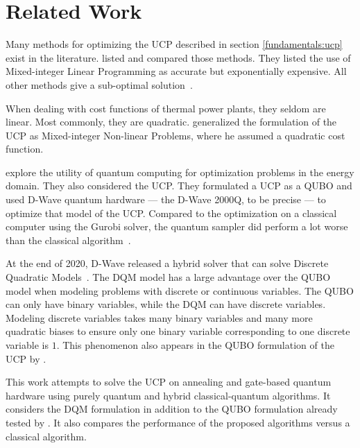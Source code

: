 \section{Related Work}

Many methods for optimizing the UCP described in section \ref{fundamentals:ucp} exist in the literature.
\citeauthor{Abujarad2017} listed and compared those methods.
They listed the use of Mixed-integer Linear Programming as accurate but exponentially expensive.
All other methods give a sub-optimal solution~\cite{Abujarad2017}.

When dealing with cost functions of thermal power plants, they seldom are linear.
Most commonly, they are quadratic.
\citeauthor{Baldick1995} generalized the formulation of the UCP as Mixed-integer Non-linear Problems, where he assumed a quadratic cost function.

\citeauthor{Ajagekar2019} explore the utility of quantum computing for optimization problems in the energy domain.
They also considered the UCP.
They formulated a UCP as a QUBO and used D-Wave quantum hardware --- the D-Wave 2000Q, to be precise --- to optimize that model of the UCP.
Compared to the optimization on a classical computer using the Gurobi solver, the quantum sampler did perform a lot worse than the classical algorithm~\cite{Ajagekar2019}.

At the end of 2020, D-Wave released a hybrid solver that can solve Discrete Quadratic Models~\cite{DQMHybrid2020}.
The DQM model has a large advantage over the QUBO model when modeling problems with discrete or continuous variables.
The QUBO can only have binary variables, while the DQM can have discrete variables.
Modeling discrete variables takes many binary variables and many more quadratic biases to ensure only one binary variable corresponding to one discrete variable is $1$.
This phenomenon also appears in the QUBO formulation of the UCP by \citeauthor{Ajagekar2019}.

This work attempts to solve the UCP on annealing and gate-based quantum hardware using purely quantum and hybrid classical-quantum algorithms.
It considers the DQM formulation in addition to the QUBO formulation already tested by \citeauthor{Ajagekar2019}.
It also compares the performance of the proposed algorithms versus a classical algorithm.
